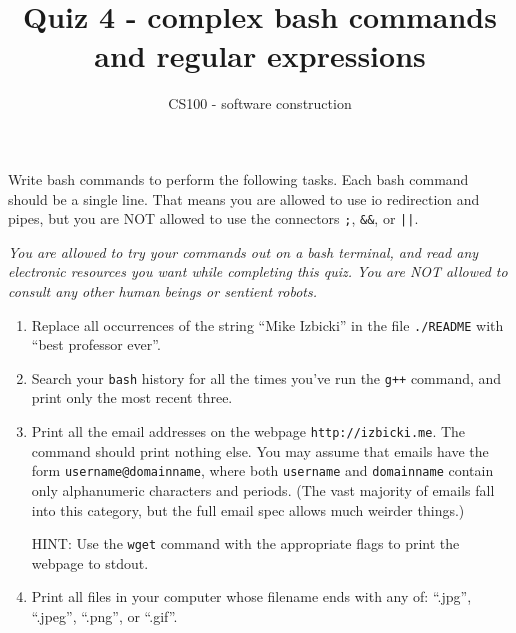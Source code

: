 \documentclass{article}
\title{Quiz 4 - complex bash commands and regular expressions}
\author{CS100 - software construction}
\begin{document}
\maketitle

\noindent
Write bash commands to perform the following tasks.
Each bash command should be a single line.
That means you are allowed to use io redirection and pipes, but you are NOT allowed to use the connectors \lstinline{;}, \lstinline{&&}, or \lstinline{||}.

\vspace{0.15in}
\noindent
\emph{You are allowed to try your commands out on a bash terminal, and read any electronic resources you want while completing this quiz.
You are NOT allowed to consult any other human beings or sentient robots.
}

\begin{enumerate}
\item
Replace all occurrences of the string ``Mike Izbicki'' in the file \lstinline{./README} with ``best professor ever''.
\vspace{3in}

\item
Search your \lstinline{bash} history for all the times you've run the \lstinline{g++} command, and print only the most recent three.

\vspace{3in}

\newpage
\item
Print all the email addresses on the webpage \lstinline{http://izbicki.me}.
The command should print nothing else.
You may assume that emails have the form \lstinline{username@domainname}, where both \lstinline{username} and \lstinline{domainname} contain only alphanumeric characters and periods.
(The vast majority of emails fall into this category, but the full email spec allows much weirder things.)

HINT: Use the \lstinline{wget} command with the appropriate flags to print the webpage to stdout.

\vspace{3in}

\item
Print all files in your computer whose filename ends with any of: ``.jpg'', ``.jpeg'', ``.png'', or ``.gif''.

\end{enumerate}
\end{document}
